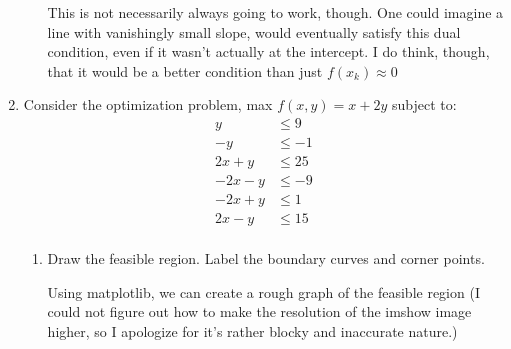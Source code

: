 \documentclass[11pt]{article}
\begin{document}
\begin{enumerate}
\begin{enumerate}
    This is not necessarily always going to work, though. One could imagine a
    line with vanishingly small slope, would eventually satisfy this dual
    condition, even if it wasn't actually at the intercept. I do think, though,
    that it would be a better condition than just $f(x_k) \approx 0$

\end{enumerate}


\item Consider the optimization problem, max $f(x,y) = x + 2y$ subject to:
\begin{align*}
    y       &\leq 9    \\
    -y      &\leq -1   \\
    2x + y  &\leq 25   \\
    -2x - y &\leq -9   \\
    -2x + y &\leq 1    \\
    2x - y &\leq 15    \\
\end{align*}

\newpage

\begin{enumerate}
    \item Draw the feasible region. Label the boundary curves and corner
        points.

    Using matplotlib, we can create a rough graph of the feasible region (I
    could not figure out how to make the resolution of the imshow image higher,
    so I apologize for it's rather blocky and inaccurate nature.)


\end{enumerate}
\end{enumerate}
\end{document}
